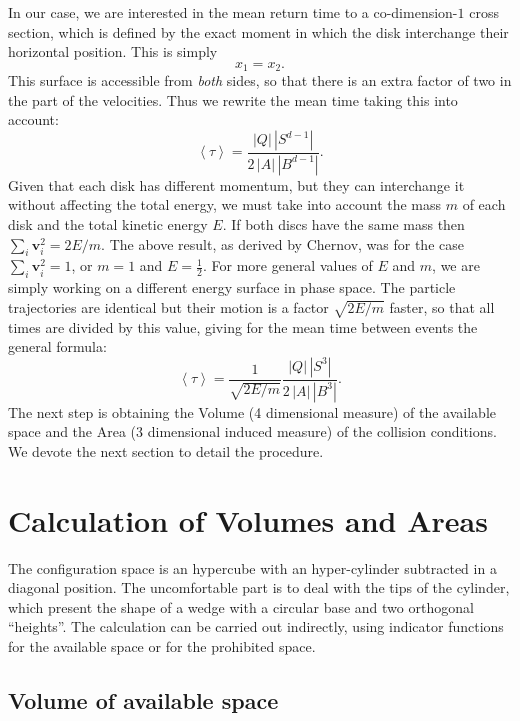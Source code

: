 \documentclass[a4paper,10pt]{article}
\newcommand{\mean}[1]{\left \langle #1 \right \rangle}
\newcommand{\vv}{\mathbf{v}}
\begin{document}
In our case, we are interested in the mean return time to 
a co-dimension-$1$ cross section, 
which is defined by the exact moment
in which the disk interchange their horizontal position. This is simply
\begin{equation} \label{condchoque}
x_1 = x_2.
\end{equation}
This surface is accessible from \emph{both} sides, 
so that there is an extra factor of two in the part of the velocities. Thus 
we rewrite the mean time taking this into account: 
\begin{equation}
 \mean{\tau} = \frac{|Q| \, |S^{d-1}|} {2 \, |A| \, |B^{d-1}|}.	
\end{equation}
Given that each disk has different momentum, but
they can interchange it without affecting the
total energy, we must take into account the mass $m$ of each disk 
and the total kinetic energy $E$.
If both discs have the same mass then $\sum_i \vv_i^2 = 2E / m$.
The above result, as derived by Chernov, 
was for the case $\sum_i \vv_i^2 = 1$, or $m=1$ and $E=\frac{1}{2}$.  
For more general values of $E$ and $m$, 
we are simply working on a different energy surface in phase space. 
The particle trajectories are identical but their motion is a factor
$\sqrt{2E/m}$ faster, so that all times are divided by this value, 
giving for
the mean time between events the general formula:
\begin{equation}
  \mean{\tau} = \frac{1}{\sqrt{2E / m}} 
\frac{|Q| \, |S^3|} {2 \, |A| \, |B^3|}.	
\end{equation}
The next step is obtaining the Volume (4 dimensional measure) of
the available space and the Area (3 dimensional induced measure) of
the collision conditions. We devote the next section to
detail the procedure.


\section{Calculation of Volumes and Areas}

The configuration
space is an hypercube with an hyper-cylinder subtracted in a diagonal position.
The uncomfortable part is to deal with the tips of the cylinder, which
present the  shape of a wedge with a circular base and two 
orthogonal ``heights''. 
The calculation can be carried out indirectly, using indicator functions for the
available space or for the  prohibited space.

\subsection{Volume of available space}
\end{document}
